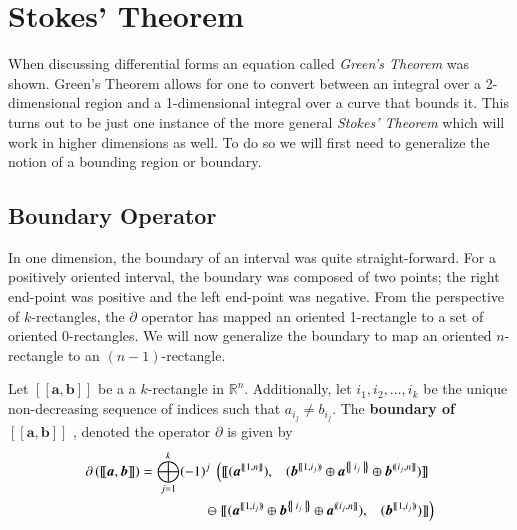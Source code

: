 %
%
\chapter{Stokes' Theorem}

When discussing differential forms an equation called \emph{Green's Theorem} was shown. 
Green's Theorem allows for one to convert between an integral over a 2-dimensional region and a 1-dimensional integral
over a curve that bounds it.
This turns out to be just one instance of the more general \emph{Stokes' Theorem} 
which will work in higher dimensions as well.
To do so we will first need to generalize the notion of a bounding region or boundary.

\newpage


\section{Boundary Operator}


In one dimension, the boundary of an interval was quite straight-forward.
For a positively oriented interval, the boundary was composed of two points; 
the right end-point was positive and the left end-point was negative.
From the perspective of $k$-rectangles, 
the $\partial$ operator has mapped an oriented 1-rectangle to a set of oriented 0-rectangles.
We will now generalize the boundary to map an oriented $n$-rectangle to an $(n-1)$-rectangle.


\begin{definition}
	Let  $[\![\boldsymbol{a}, \boldsymbol{b}]\!]$ be a a $k$-rectangle in $\mathbb{R}^n$.
	Additionally, let $i_1, i_2, \ldots, i_k$ be the unique non-decreasing sequence of indices such that $a_{i_j} \neq b_{i_j}$.
	The \textbf{boundary of $ \boldsymbol{[\![ a,b ]\!]} $ }, denoted the operator $\partial$ is given by
	\begin{align}
		\partial \left( [\![ \boldsymbol{a}, \boldsymbol{b} ]\!] \right) 
		= \bigoplus_{j=1}^k (-1)^j \;
			\left(	
				[\![ 	(\boldsymbol{a}^{[\![1,n]\!]}), 
					\;\;\;
					(\boldsymbol{b}^{[\![1,i_j)\!)} 
						\oplus \boldsymbol{a}^{\hset{i_j}}
						\oplus \boldsymbol{b}^{(\!(i_j,n]\!]}) 
				]\!] \right.\;
			\notag\\
			\ominus \left.
				[\![ 	(\boldsymbol{a}^{[\![1,i_j)\!)}
						\oplus \boldsymbol{b}^{\hset{i_j}}
						\oplus \boldsymbol{a}^{(\!(i_j, n]\!]}), 
					\;\;\;		 
					(\boldsymbol{b}^{[\![1,i_j)\!)}) 			
				]\!]
			\right)
	\end{align}
\end{definition}


